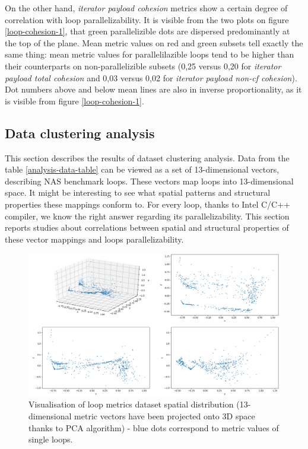 \null\qquad On the other hand, \textit{iterator payload cohesion} metrics show a certain degree of correlation with loop parallelizability. It is visible from the two plots on figure \ref{loop-cohesion-1}, that green parallelizible dots are dispersed predominantly at the top of the plane. Mean metric values on red and green subsets tell exactly the same thing: mean metric values for parallelilazible loops tend to be higher than their counterparts on non-parallelizible subsets (0,25 versus 0,20 for \textit{iterator payload total cohesion} and 0,03 versus 0,02 for \textit{iterator payload non-cf cohesion}). Dot numbers above and below mean lines are also in inverse proportionality, as it is visible from figure \ref{loop-cohesion-1}.     
\subsection{Data clustering analysis}
\label{analysis-data-clustering-analysis}
\qquad This section describes the results of dataset clustering analysis. Data from the table \ref{analysis-data-table} can be viewed as a set of 13-dimensional vectors, describing NAS benchmark loops. These vectors map loops into 13-dimensional space. It might be interesting to see what spatial patterns and structural properties these mappings conform to. For every loop, thanks to Intel C/C++ compiler, we know the right answer regarding its parallelizability. This section reports studies about correlations between spatial and structural properties of these vector mappings and loops parallelizability.\newline
\begin{figure}[htb]
\centering
\includegraphics[width=\linewidth]{figs/metrics-pca-13-to-3.png}
\caption{Visualisation of loop metrics dataset spatial distribution (13-dimensional metric vectors have been projected onto 3D space thanks to PCA algorithm) - blue dots correspond to metric values of single loops.}
\label{metrics-pca-13-to-3}
\end{figure} \newline 
